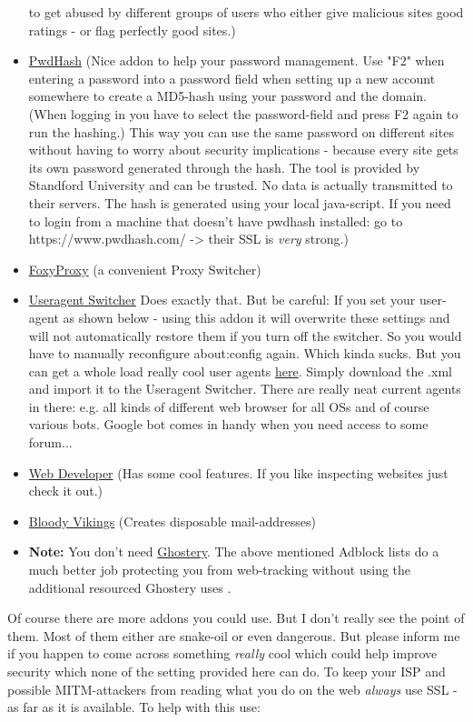 \documentclass{article}
\begin{document}
\begin{itemize}
to get abused by different groups of users who either give malicious sites good ratings - or flag perfectly good sites.)
	\item \href{https://addons.mozilla.org/en-US/firefox/addon/pwdhash/}{PwdHash} (Nice addon to help your password management. Use "F2" when entering a password into a password field when setting up a new account somewhere to create a MD5-hash using your password and the domain. (When logging in you have to select the password-field and press F2 again to run the hashing.) This way you can use the same password on different sites without having to worry about security implications - because every site gets its own password generated through the hash. The tool is provided by Standford University and can be trusted. No data is actually transmitted to their servers. The hash is generated using your local java-script. If you need to login from a machine that doesn't have pwdhash installed: go to https://www.pwdhash.com/ -> their SSL is \emph{very} strong.)
	\item \href{https://addons.mozilla.org/en-US/firefox/addon/foxyproxy-standard/}{FoxyProxy} (a convenient Proxy Switcher)
	\item \href{https://addons.mozilla.org/en-US/firefox/addon/user-agent-switcher}{Useragent Switcher} Does exactly that. But be careful: If you set your user-agent as shown below - using this addon it will overwrite these settings and will not automatically restore them if you turn off the switcher. So you would have to manually reconfigure about:config again. Which kinda sucks. But you can get a whole load really cool user agents \href{http://techpatterns.com/forums/about304.html}{here}. Simply download the .xml and import it to the Useragent Switcher. There are really neat current agents in there: e.g. all kinds of different web browser for all OSs and of course various bots. Google bot comes in handy when you need access to some forum... 
	\item \href{https://addons.mozilla.org/en-US/firefox/addon/web-developer/}{Web Developer} (Has some cool features. If you like inspecting websites just check it out.)
	\item \href{https://addons.mozilla.org/en-US/firefox/addon/bloody-vikings/}{Bloody Vikings} (Creates disposable mail-addresses)
	\item \textbf{Note:} You don't need \href{https://addons.mozilla.org/en-US/firefox/addon/ghostery/}{Ghostery}. The above mentioned Adblock lists do a much better job protecting you from web-tracking without using the additional resourced Ghostery uses .
  \end{itemize}
  Of course there are more addons you could use. But I don't really see the point of them. Most of them either are snake-oil or even dangerous. But please inform me if you happen to come across something \emph{really} cool which could help improve security which none of the setting provided here can do. 
  To keep your ISP and possible MITM-attackers from reading what you do on the web \emph{always} use SSL - as far as it is available. To help with this use:
\end{document}
